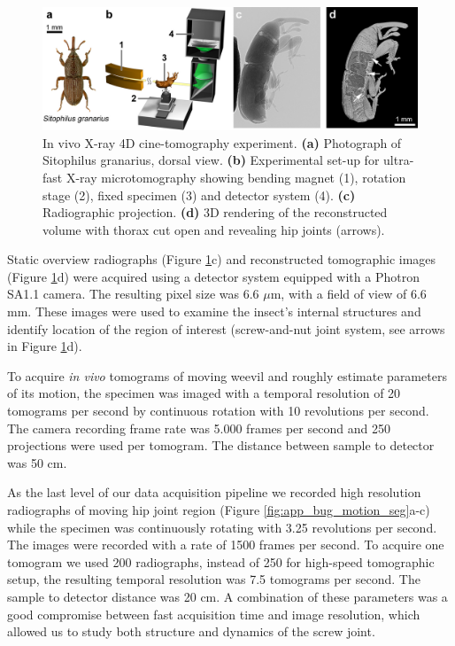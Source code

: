 \begin{figure}[ht]
  \centerline{
    \includegraphics[scale = 0.225]{figures/app_bug_setup.PNG} 
  }  
  \caption{In vivo X-ray 4D cine-tomography experiment. \textbf{(a)} Photograph of Sitophilus granarius, dorsal
view. \textbf{(b)} Experimental set-up for ultra-fast X-ray microtomography showing bending magnet (1),
rotation stage (2), fixed specimen (3) and detector system (4). \textbf{(c)} Radiographic projection. \textbf{(d)} 3D
rendering of the reconstructed volume with thorax cut open and revealing hip joints (arrows).}
  \label{fig:app_bug_setup}
\end{figure}

Static overview radiographs (Figure \ref{fig:app_bug_setup}c) and reconstructed tomographic images (Figure \ref{fig:app_bug_setup}d) were acquired using a detector system
equipped with a Photron SA1.1 camera. The resulting pixel size was 6.6 $\mu$m,
with a field of view of 6.6 mm. These images were used to examine the insect's internal structures and identify location of the region of interest (screw-and-nut joint system, see arrows in Figure \ref{fig:app_bug_setup}d).




To acquire \textit{in vivo} tomograms of moving weevil and roughly estimate parameters of its motion, the specimen was imaged with a temporal resolution of 20 tomograms per second by 
continuous rotation with 10 revolutions per second. The camera recording frame rate was 5.000 frames per second and 250 projections were used per tomogram. The distance between sample to detector was 50 cm.

As the last level of our data acquisition pipeline we recorded high resolution radiographs of moving hip joint region (Figure \ref{fig:app_bug_motion_seg}a-c) while the specimen was continuously rotating with 3.25 revolutions per second.
The images were recorded with a rate of 1500 frames per second. To acquire one tomogram we used 200 radiographs, instead of 250 for high-speed tomographic setup, the resulting temporal resolution was 7.5 tomograms per second. The sample to detector distance was 20 cm.
A combination of these parameters was a good compromise between fast acquisition time and image resolution, which allowed us to study both structure and dynamics of the screw joint. 

